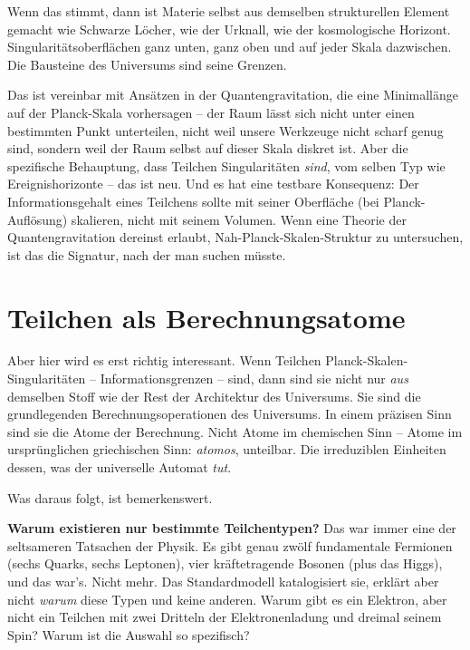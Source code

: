 \documentclass[11pt, twoside, openright]{book}
\begin{document}
Wenn das stimmt, dann ist Materie selbst aus demselben strukturellen Element gemacht wie Schwarze Löcher, wie der Urknall, wie der kosmologische Horizont. Singularitätsoberflächen ganz unten, ganz oben und auf jeder Skala dazwischen. Die Bausteine des Universums sind seine Grenzen.

Das ist vereinbar mit Ansätzen in der Quantengravitation, die eine Minimallänge auf der Planck-Skala vorhersagen -- der Raum lässt sich nicht unter einen bestimmten Punkt unterteilen, nicht weil unsere Werkzeuge nicht scharf genug sind, sondern weil der Raum selbst auf dieser Skala diskret ist. Aber die spezifische Behauptung, dass Teilchen Singularitäten \textit{sind}, vom selben Typ wie Ereignishorizonte -- das ist neu. Und es hat eine testbare Konsequenz: Der Informationsgehalt eines Teilchens sollte mit seiner Oberfläche (bei Planck-Auflösung) skalieren, nicht mit seinem Volumen. Wenn eine Theorie der Quantengravitation dereinst erlaubt, Nah-Planck-Skalen-Struktur zu untersuchen, ist das die Signatur, nach der man suchen müsste.

\section*{Teilchen als Berechnungsatome}

Aber hier wird es erst richtig interessant. Wenn Teilchen Planck-Skalen-Singularitäten -- Informationsgrenzen -- sind, dann sind sie nicht nur \textit{aus} demselben Stoff wie der Rest der Architektur des Universums. Sie sind die grundlegenden Berechnungsoperationen des Universums. In einem präzisen Sinn sind sie die Atome der Berechnung. Nicht Atome im chemischen Sinn -- Atome im ursprünglichen griechischen Sinn: \textit{atomos}, unteilbar. Die irreduziblen Einheiten dessen, was der universelle Automat \textit{tut}.

Was daraus folgt, ist bemerkenswert.

\textbf{Warum existieren nur bestimmte Teilchentypen?} Das war immer eine der seltsameren Tatsachen der Physik. Es gibt genau zwölf fundamentale Fermionen (sechs Quarks, sechs Leptonen), vier kräftetragende Bosonen (plus das Higgs), und das war's. Nicht mehr. Das Standardmodell katalogisiert sie, erklärt aber nicht \textit{warum} diese Typen und keine anderen. Warum gibt es ein Elektron, aber nicht ein Teilchen mit zwei Dritteln der Elektronenladung und dreimal seinem Spin? Warum ist die Auswahl so spezifisch?
\end{document}
